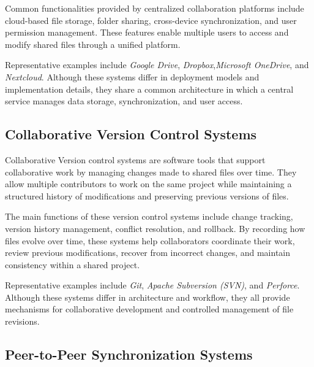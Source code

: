 Common functionalities provided by centralized collaboration platforms include cloud-based file storage, folder sharing, cross-device synchronization, and user permission management.
These features enable multiple users to access and modify shared files through a unified platform.

Representative examples include \textit{Google Drive}, \textit{Dropbox},\textit {Microsoft OneDrive}, and \textit{Nextcloud}.
Although these systems differ in deployment models and implementation details, they share a common architecture in which a central service manages data storage, synchronization, and user access.

\subsection{Collaborative Version Control Systems}

%
%

Collaborative Version control systems are software tools that support collaborative work by managing changes made to shared files over time. 
They allow multiple contributors to work on the same project while maintaining a structured history of modifications and preserving previous versions of files.

The main functions of these version control systems include change tracking, version history management, conflict resolution, and rollback.
By recording how files evolve over time, these systems help collaborators coordinate their work, review previous modifications, recover from incorrect changes, and maintain consistency within a shared project.

Representative examples include \textit{Git}, \textit{Apache Subversion (SVN)}, and \textit{Perforce}.
Although these systems differ in architecture and workflow, they all provide mechanisms for collaborative development and controlled management of file revisions.

\subsection{Peer-to-Peer Synchronization Systems}

%
%


